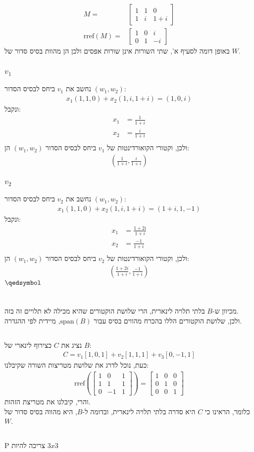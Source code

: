 \documentclass[a4paper, 12pt, leqno]{article}
\newcommand{\sub}[1]{\subsection{\underline{#1}}}
\newcommand{\subsub}[1]{\subsubsection{\underline{#1}}}
\newcommand{\eq}[1]{\begin{align*}#1\end{align*}}
\renewcommand{\qed}{\hfill\(\qedsymbol\)}
\begin{document}
\eq{
    M=&\begin{bmatrix}
        1&1&0\\
        1&i&1+i
    \end{bmatrix}
    \\
    \text{rref}(M)=&\begin{bmatrix}
        1&0&i\\
        0&1&-i
    \end{bmatrix}
}
באופן דומה לסעיף א', שתי השורות אינן שורות אפסים ולכן הן מהוות בסיס סדור של $W$.
\sub{}
\subsub{$v_1$}
נחשב את $v_1$ ביחס לבסיס הסדור $(w_1,w_2)$:
\eq{
    x_1(1,1,0)+x_2(1,i,1+i)=(1,0,i)
}
ונקבל:
\eq{
    x_1&=\frac{1}{1+i}\\
    x_2&=\frac{i}{1+i}\\
}
ולכן, וקטורי הקואורדינטות של $v_1$ ביחס לבסיס הסדור $(w_1,w_2)$ הן:
\eq{
    (\frac{1}{1+i}, \frac{i}{1+i})
}
\subsub{$v_2$}
נחשב את $v_2$ ביחס לבסיס הסדור $(w_1,w_2)$:
\eq{
    x_1(1,1,0)+x_2(1,i,1+i)=(1+i,1,-1)
}
ונקבל:
\eq{
    x_1&=\frac{1+2i}{1+i}\\
    x_2&=\frac{-1}{1+i}\\
}
ולכן, וקטורי הקואורדינטות של $v_2$ ביחס לבסיס הסדור $(w_1,w_2)$ הן:
\eq{
    (\frac{1+2i}{1+i}, \frac{-1}{1+i})
}
\qed

\setcounter{section}{20}
\section{}
\sub{}
מכיוון ש-$B$ בלתי תלויה לינארית, הרי שלושת הוקטורים שהיא מכילה לא תלויים זה בזה.\\
ולכן, שלושת הוקטורים הללו בהכרח מהווים בסיס עבור $\text{span}(B)$, מיידית לפי ההגדרה.
\sub{}
נציג את $C$ כצירוף לינארי של $B$:
\eq{
    C=v_1[1,0,1]+v_2[1,1,1]+v_3[0,-1,1]
}
כעת, נוכל לדרג את שלושת מטריצות השורה שקיבלנו:
\eq{
    \text{rref}(
        \begin{bmatrix}
            1&0&1\\
            1&1&1\\
            0&-1&1
        \end{bmatrix}
    )
    =\begin{bmatrix}
        1&0&0\\
        0&1&0\\
        0&0&1
    \end{bmatrix}
}
והרי, קיבלנו את מטריצת הזהות.\\
כלומר, הראינו כי $C$ היא סדרה בלתי תלויה לינארית, ובדומה ל-$B$, היא מהווה בסיס סדור של $W$.
\sub{}
P צריכה להיות $3x3$

\end{document}
